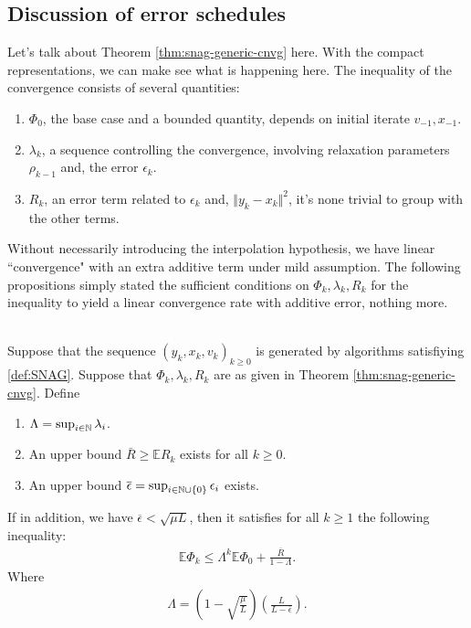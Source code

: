 \documentclass[12pt]{article}
\newcommand{\expect}{\ensuremath{\mathbb E}}
\begin{document}
    \subsection{Discussion of error schedules}
        Let's talk about Theorem \ref{thm:snag-generic-cnvg} here. 
        With the compact representations, we can make see what is happening here. 
        The inequality of the convergence consists of several quantities: 
        \begin{enumerate}[nosep]
            \item $\Phi_0$, the base case and a bounded quantity, depends on initial iterate $v_{-1}, x_{-1}$. 
            \item $\lambda_k$, a sequence controlling the convergence, involving relaxation parameters $\rho_{k - 1}$ and, the error $\epsilon_k$. 
            \item $R_k$, an error term related to $\epsilon_k$ and, $\Vert y_k - x_k\Vert^2$, it's none trivial to group with the other terms. 
        \end{enumerate} 
        Without necessarily introducing the interpolation hypothesis, we have linear ``convergence" with an extra additive term under mild assumption. 
        The following propositions simply stated the sufficient conditions on $\Phi_k, \lambda_k, R_k$ for the inequality to yield a linear convergence rate with additive error, nothing more. 
        \begin{proposition}\;\label{prop:snag-kinda-converge}\\
            Suppose that the sequence $(y_k, x_k, v_k)_{k \ge 0}$ is generated by algorithms satisfiying \ref{def:SNAG}. 
            Suppose that $\Phi_k, \lambda_k, R_k$ are as given in Theorem \ref{thm:snag-generic-cnvg}. 
            Define
            \begin{enumerate}[nosep]
                \item $\Lambda = \sup_{i \in \mathbb N} \lambda_i$. 
                \item An upper bound $\bar R \ge \expect R_k$ exists for all $k \ge 0$. 
                \item An upper bound $\overline \epsilon = \sup_{i \in \mathbb N \cup\{0\}} \epsilon_i$ exists. 
            \end{enumerate}
            If in addition, we have $\overline \epsilon < \sqrt{\mu L}$, then it satisfies for all $k \ge 1$ the following inequality: 
            \begin{align*}
                \expect \Phi_k \le \Lambda^k \expect \Phi_0 + \frac{\overline R}{1 - \Lambda}. 
            \end{align*}
            Where 
            \begin{align*}
            \Lambda = \left(
                1 - \sqrt{\frac{\mu}{L}}
                \right)\left(
                    \frac{L}{L - \overline \epsilon}
                \right).
            \end{align*}
        \end{proposition}
\end{document}
